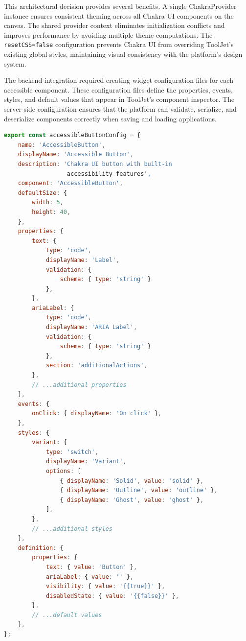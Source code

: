 This architectural decision provides several benefits. A single ChakraProvider instance ensures consistent theming across all Chakra UI components on the canvas. The shared provider context eliminates initialization conflicts and improves performance by avoiding multiple theme computations. The \texttt{resetCSS={false}} configuration prevents Chakra UI from overriding ToolJet's existing global styles, maintaining visual consistency with the platform's design system.

The backend integration required creating widget configuration files for each accessible component. These configuration files define the properties, events, styles, and default values that appear in ToolJet's component inspector. The server-side configuration ensures that the platform can validate, serialize, and deserialize components correctly when saving and loading applications.

\begin{lstlisting}[language=JavaScript, caption=Server-Side Widget Configuration Structure]
export const accessibleButtonConfig = {
    name: 'AccessibleButton',
    displayName: 'Accessible Button',
    description: 'Chakra UI button with built-in 
                  accessibility features',
    component: 'AccessibleButton',
    defaultSize: {
        width: 5,
        height: 40,
    },
    properties: {
        text: {
            type: 'code',
            displayName: 'Label',
            validation: { 
                schema: { type: 'string' } 
            },
        },
        ariaLabel: {
            type: 'code',
            displayName: 'ARIA Label',
            validation: { 
                schema: { type: 'string' } 
            },
            section: 'additionalActions',
        },
        // ...additional properties
    },
    events: {
        onClick: { displayName: 'On click' },
    },
    styles: {
        variant: {
            type: 'switch',
            displayName: 'Variant',
            options: [
                { displayName: 'Solid', value: 'solid' },
                { displayName: 'Outline', value: 'outline' },
                { displayName: 'Ghost', value: 'ghost' },
            ],
        },
        // ...additional styles
    },
    definition: {
        properties: {
            text: { value: 'Button' },
            ariaLabel: { value: '' },
            visibility: { value: '{{true}}' },
            disabledState: { value: '{{false}}' },
        },
        // ...default values
    },
};
\end{lstlisting}

